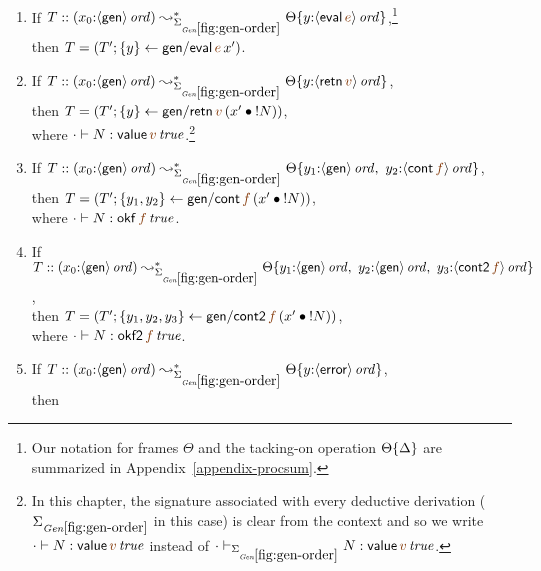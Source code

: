 \bigskip
\begin{lemma}~
\begin{enumerate}
\item If 
   $T :: (x_0{:}\istrue{\susp{\sf gen}}) \leadsto^*_{\siggenorder}
         \tackon{\Theta}{y{:}\istrue{\susp{{\sf eval}\,\lf{e}}}}$,\footnote{Our notation for frames $\Theta$ and the tacking-on operation ${\Theta}\{{\Delta}\}$ are summarized in Appendix~\ref{appendix-procsum}.}
\\ then 
   $T = \left(T'; \trstep{y}{{\sf gen/eval}\,\lf{e}\,x'}\right)$.
\medskip
\item If 
   $T :: (x_0{:}\istrue{\susp{\sf gen}}) \leadsto^*_{\siggenorder}
         \tackon{\Theta}{y{:}\istrue{\susp{{\sf retn}\,\lf{v}}}}$,
\\ then 
   $T = \left(T'; \trstep{y}{{\sf gen/retn}\,\lf{v}\,(\tfuser{x'}{\tbangr{N}})}\right)$,
\\ where 
   $\cdot \vdash N : \isconc{{{{\sf value}\,\lf{v}}}}$.\footnote{In this
chapter, the signature associated with every deductive derivation
($\siggenorder$ in this case)
is clear from the context and so we write 
$\cdot \vdash N : \isconc{{{{\sf value}\,\lf{v}}}}$ instead of 
$\cdot \vdash_{\siggenorder} N : \isconc{{{{\sf value}\,\lf{v}}}}$.}
\medskip
\item If 
   $T :: (x_0{:}\istrue{\susp{\sf gen}}) \leadsto^*_{\siggenorder}
         \tackon{\Theta}{y_1{:}\istrue{\susp{{\sf gen}}}, ~
                         y_2{:}\istrue{\susp{{\sf cont}\,\lf{f}}}}$,
\\ then 
   $T = \left(T'; \trstep{y_1,y_2}{{\sf gen/cont}\,\lf{f}\,(\tfuser{x'}{\tbangr{N}})}\right)$,
\\ where 
   $\cdot \vdash N : \isconc{{{{\sf okf}\,\lf{f}}}}$.
\medskip
\item If
   $T :: (x_0{:}\istrue{\susp{\sf gen}}) \leadsto^*_{\siggenorder}
         \tackon{\Theta}{y_1{:}\istrue{\susp{{\sf gen}}}, ~
                         y_2{:}\istrue{\susp{{\sf gen}}}, ~
                         y_3{:}\istrue{\susp{{\sf cont2}\,\lf{f}}}}$,
\\ then 
   $T = \left(T'; \trstep{y_1,y_2,y_3}{{\sf gen/cont2}\,\lf{f}\,(\tfuser{x'}{\tbangr{N}})}\right)$,
\\ where 
   $\cdot \vdash N : \isconc{{{{\sf okf2}\,\lf{f}}}}$.
\medskip
\item If 
   $T :: (x_0{:}\istrue{\susp{\sf gen}}) \leadsto^*_{\siggenorder}
         \tackon{\Theta}{y{:}\istrue{\susp{{\sf error}}}}$,
\\ then 

\end{enumerate}
\end{lemma}
